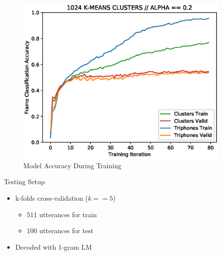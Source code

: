 \documentclass[final]{beamer} %
\newlength{\columnheight}
\begin{document}
\begin{frame}
\begin{columns}
\begin{column}{0.23\textwidth}
{        \vfill

        \begin{figure}[!htbp]
          \centering
          \includegraphics[width=\linewidth]{figs/1_point_2_1024.eps}
          \caption{Model Accuracy During Training}
          \endminipage\hfill
        \end{figure}

        
        \vfill

        
        \begin{block}{\boxnumber Testing Setup}
          \begin{itemize}
          \item k-folds cross-validation ($k==5$)
            \begin{itemize}
            \item 511 utterances for train
            \item 100 utterances for test
            \end{itemize}
            \item Decoded with 1-gram LM      
          \end{itemize}
        \end{block}

        \vfill
        

      } %
    \end{column}




    
    \begin{column}{0.23\textwidth}
      \parbox[t][\columnheight]{.9\textwidth}{
          
}
\end{column}
\end{columns}
\end{frame}
\end{document}
